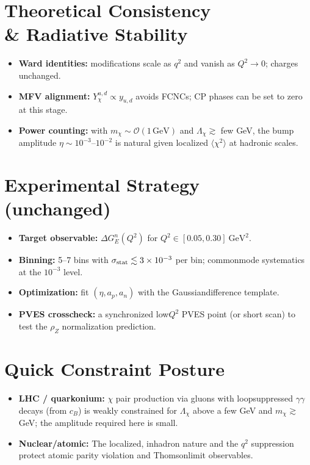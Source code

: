 \documentclass[11pt]{article}
\newcommand{\GN}{G_E^n}
\begin{document}
\section{Theoretical Consistency \\& Radiative Stability}
\begin{itemize}
  \item \textbf{Ward identities:} modifications scale as $q^2$ and vanish as $Q^2\to0$; charges unchanged.
  \item \textbf{MFV alignment:} $Y_\chi^{u,d}\propto y_{u,d}$ avoids FCNCs; CP phases can be set to zero at this stage.
  \item \textbf{Power counting:} with $m_\chi\sim\mathcal{O}(1\,\mathrm{GeV})$ and $\Lambda_\chi\gtrsim$ few GeV, the bump amplitude $\eta\sim10^{-3}$--$10^{-2}$ is natural given localized $\langle\chi^2\rangle$ at hadronic scales.
\end{itemize}

\section{Experimental Strategy (unchanged)}
\begin{itemize}
  \item \textbf{Target observable:} $\Delta \GN(Q^2)$ for $Q^2\in[0.05,0.30]~\mathrm{GeV}^2$.
  \item \textbf{Binning:} 5--7 bins with $\sigma_{\rm stat}\lesssim 3\times10^{-3}$ per bin; common\mbox{\textendash}mode systematics at the $10^{-3}$ level.
  \item \textbf{Optimization:} fit $(\eta,a_p,a_n)$ with the Gaussian\mbox{\textendash}difference template.
  \item \textbf{PVES cross\mbox{\textendash}check:} a synchronized low\mbox{$Q^2$} PVES point (or short scan) to test the $\rho_Z$ normalization prediction.
\end{itemize}

\section{Quick Constraint Posture}
\begin{itemize}
  \item \textbf{LHC / quarkonium:} $\chi$ pair production via gluons with loop\mbox{\textendash}suppressed $\gamma\gamma$ decays (from $c_B$) is weakly constrained for $\Lambda_\chi$ above a few GeV and $m_\chi\gtrsim$ GeV; the amplitude required here is small.
  \item \textbf{Nuclear/atomic:} The localized, in\mbox{\textendash}hadron nature and the $q^2$ suppression protect atomic parity violation and Thomson\mbox{\textendash}limit observables.
\end{itemize}
\end{document}

